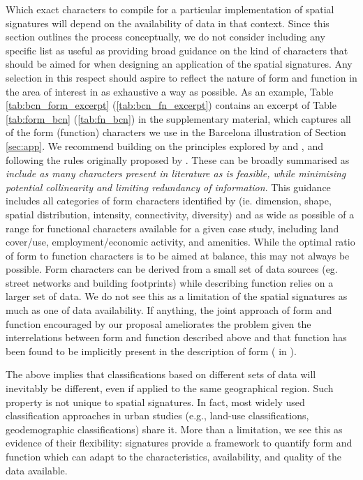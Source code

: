 Which exact characters to compile for a particular implementation of spatial signatures
will depend on the availability of data in that context.
Since this section outlines the process conceptually, we do not consider including any specific
list as useful as providing broad guidance on the kind of characters that should
be aimed for when designing an application of the spatial signatures.
Any selection in this respect should aspire to reflect the nature of form and function in the
area of interest in as exhaustive a way as possible.
As an example,
Table \ref{tab:bcn_form_excerpt} (\ref{tab:bcn_fn_excerpt}) contains an excerpt of Table
\ref{tab:form_bcn} (\ref{tab:fn_bcn}) in the supplementary
material, which captures all of the form (function) characters we use in the Barcelona illustration of
Section \ref{sec:app}.
%
We recommend building on the principles explored by \cite{dibble2019origin} and
\cite{fleischmann2021methodological}, and following the rules originally proposed by
\cite{sneath1973numerical}. These can be broadly summarised as
\emph{include as many characters present in literature as is feasible, while minimising
potential collinearity and limiting redundancy of information}. This guidance includes all
categories of form characters identified by \cite{fleischmann2020measuring} (ie. dimension,
shape, spatial distribution, intensity, connectivity, diversity) and as wide as possible of a range
for functional characters available for a given case study, including land cover/use,
employment/economic activity, and amenities.
%
While the optimal ratio of form to function characters is to be aimed at balance, this may not
always be possible. Form characters can be derived from a small set of data sources (eg.
street networks and building footprints) while describing function relies on a larger set
of data. We do not see this as a limitation of the spatial signatures as much as one
of data availability. If anything, the joint approach of form and function encouraged
by our proposal ameliorates the problem given the interrelations between form and function
described above and that function has been found to be implicitly present in the description of form
(\citealp{caniggia2001architectural} in \citealp{kropf2009aspects}).

The above implies that classifications based on different sets of data will
inevitably be different, even if applied to the same geographical region.
Such property is not unique to spatial signatures. In fact, most widely used classification approaches in
urban studies (e.g., land-use classifications,
geodemographic classifications) share it.
%
More than a limitation, we see this as
evidence of their flexibility: signatures provide a framework to quantify form and
function which can adapt to the characteristics, availability, and quality of
the data available.

